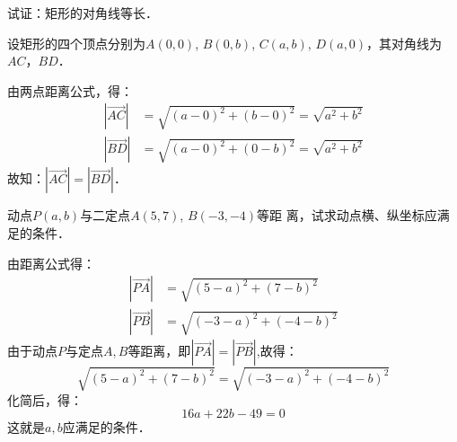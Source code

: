 \begin{example}
    试证：矩形的对角线等长．
\end{example}

\begin{solution}
设矩形的四个顶点分别为$A(0,0)$, $B(0,b)$, $C(a,b)$, $D(a,0)$，其对角线为$AC$，$BD$．

由两点距离公式，得：
\[\begin{split}
    |\Vec{AC}|&=\sqrt{(a-0)^2+(b-0)^2}=\sqrt{a^2+b^2}\\
|\Vec{BD}|&=\sqrt{(a-0)^2+(0-b)^2}=\sqrt{a^2+b^2}
\end{split}\]
故知：$|\Vec{AC}|=|\Vec{BD}|$．
\end{solution}

\begin{example}
    动点$P(a,b)$与二定点$A(5,7)$, $B(-3,-4)$等距
离，试求动点横、纵坐标应满足的条件．
\end{example}


\begin{solution}
    由距离公式得：
\[\begin{split}
    |\Vec{PA}|&=\sqrt{(5-a)^2+(7-b)^2}\\
    |\Vec{PB}|&=\sqrt{(-3-a)^2+(-4-b)^2}
\end{split}\]
由于动点$P$与定点$A,B$等距离，即$|\Vec{PA}|=|\Vec{PB}|$,故得：
\[\sqrt{(5-a)^2+(7-b)^2}=\sqrt{(-3-a)^2+(-4-b)^2}\]
化简后，得：
\[16a+22b-49=0\]
这就是$a,b$应满足的条件．
\end{solution}

